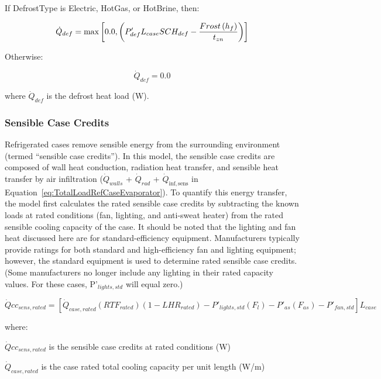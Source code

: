 If DefrostType is Electric, HotGas, or HotBrine, then:

\begin{equation}
  \dot{Q}_{def} = \max\left[0.0,\left(P_{def}' L_{case} SCH_{def} - \frac{Frost\left(h_f\right)}{t_{zn}}\right)\right]
\end{equation}

Otherwise:

\begin{equation}
  \dot{Q}_{def} = 0.0
\end{equation}

where \({\dot Q_{def}}\) is the defrost heat load (W).

\subsubsection{Sensible Case Credits}\label{sensible-case-credits}

Refrigerated cases remove sensible energy from the surrounding environment (termed ``sensible case credits''). In this model, the sensible case credits are composed of wall heat conduction, radiation heat transfer, and sensible heat transfer by air infiltration (\({\dot Q_{walls}}\) + \({\dot Q_{rad}}\) + \({\dot Q_{{\mathrm{inf,sens}}}}\) in Equation~\ref{eq:TotalLoadRefCaseEvaporator}). To quantify this energy transfer, the model first calculates the rated sensible case credits by subtracting the known loads at rated conditions (fan, lighting, and anti-sweat heater) from the rated sensible cooling capacity of the case. It should be noted that the lighting and fan heat discussed here are for standard-efficiency equipment. Manufacturers typically provide ratings for both standard and high-efficiency fan and lighting equipment; however, the standard equipment is used to determine rated sensible case credits. (Some manufacturers no longer include any lighting in their rated capacity values. For these cases, P'\(_{lights,std}\) will equal zero.)

\begin{equation}
\dot Qc{c_{sens,rated}} = \left[ {{{\dot Q}_{case,rated}}\left( {RT{F_{rated}}} \right)\left( {1 - LH{R_{rated}}} \right) - {P'}_{lights,std}\left( {{F_l}} \right) - {P'}_{as}\left( {{F_{as}}} \right) - {P'}_{fan,std}} \right]{L_{case}}
\end{equation}

where:

\(\dot Qc{c_{sens,rated}}\) is the sensible case credits at rated conditions (W)

\({\dot Q_{case,rated}}\) is the case rated total cooling capacity per unit length (W/m)


